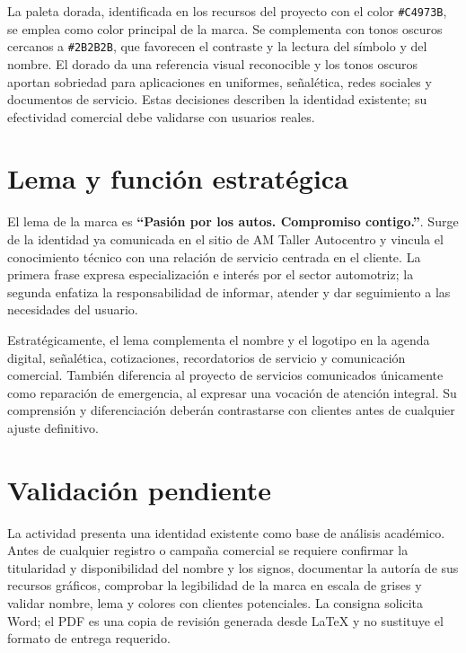 {La paleta dorada, identificada en los recursos del proyecto con el color \texttt{\#C4973B}, se emplea como color principal de la marca. Se complementa con tonos oscuros cercanos a \texttt{\#2B2B2B}, que favorecen el contraste y la lectura del símbolo y del nombre. El dorado da una referencia visual reconocible y los tonos oscuros aportan sobriedad para aplicaciones en uniformes, señalética, redes sociales y documentos de servicio. Estas decisiones describen la identidad existente; su efectividad comercial debe validarse con usuarios reales.

\section{Lema y función estratégica}
El lema de la marca es \textbf{``Pasión por los autos. Compromiso contigo.''}. Surge de la identidad ya comunicada en el sitio de AM Taller Autocentro y vincula el conocimiento técnico con una relación de servicio centrada en el cliente. La primera frase expresa especialización e interés por el sector automotriz; la segunda enfatiza la responsabilidad de informar, atender y dar seguimiento a las necesidades del usuario.

Estratégicamente, el lema complementa el nombre y el logotipo en la agenda digital, señalética, cotizaciones, recordatorios de servicio y comunicación comercial. También diferencia al proyecto de servicios comunicados únicamente como reparación de emergencia, al expresar una vocación de atención integral. Su comprensión y diferenciación deberán contrastarse con clientes antes de cualquier ajuste definitivo.

\section{Validación pendiente}
La actividad presenta una identidad existente como base de análisis académico. Antes de cualquier registro o campaña comercial se requiere confirmar la titularidad y disponibilidad del nombre y los signos, documentar la autoría de sus recursos gráficos, comprobar la legibilidad de la marca en escala de grises y validar nombre, lema y colores con clientes potenciales. La consigna solicita Word; el PDF es una copia de revisión generada desde LaTeX y no sustituye el formato de entrega requerido.
}
